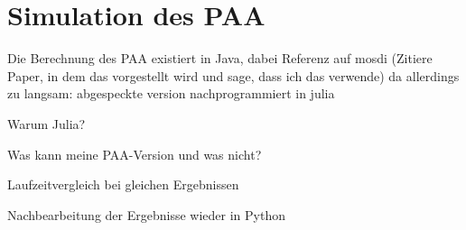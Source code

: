 
\section{Simulation des PAA}
Die Berechnung des PAA existiert in Java, dabei Referenz auf mosdi (Zitiere Paper, in dem das vorgestellt wird und sage, dass ich das verwende)
da allerdings zu langsam: abgespeckte version nachprogrammiert in julia

Warum Julia? 

Was kann meine PAA-Version und was nicht?

Laufzeitvergleich bei gleichen Ergebnissen

Nachbearbeitung der Ergebnisse wieder in Python



